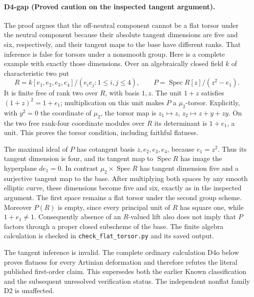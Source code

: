 \paragraph{D4-gap (Proved caution on the inspected tangent argument).}
The proof argues that the off-neutral component cannot be a
flat torsor under the neutral component because their absolute
tangent dimensions are five and six, respectively, and their
tangent maps to the base have different ranks.  That inference
is false for torsors under a nonsmooth group.  Here is a complete
example with exactly those dimensions.  Over an algebraically
closed field $k$ of characteristic two put
\[
 R=k[e_1,e_2,e_3,e_4]/(e_i e_j:1\leq i,j\leq4),
 \qquad P=\operatorname{Spec}R[z]/(z^2-e_1).
\]
It is finite free of rank two over $R$, with basis $1,z$.
The unit $1+z$ satisfies $(1+z)^2=1+e_1$; multiplication on this
unit makes $P$ a $\mu_2$-torsor.  Explicitly, with $y^2=0$ the
coordinate of $\mu_2$, the torsor map is
$z_1\mapsto z$, $z_2\mapsto z+y+zy$.
On the two free rank-four coordinate modules over $R$ its
determinant is $1+e_1$, a unit.  This proves the torsor condition,
including faithful flatness.

The maximal ideal of $P$ has cotangent basis $z,e_2,e_3,e_4$,
because $e_1=z^2$.  Thus its tangent dimension is four, and its
tangent map to $\operatorname{Spec}R$ has image the hyperplane
$de_1=0$.  In contrast $\mu_2\times\operatorname{Spec}R$ has
tangent dimension five and a surjective tangent map to the base.
After multiplying both spaces by any smooth elliptic curve,
these dimensions become five and six, exactly as in the inspected
argument.  The first space remains a flat torsor under the
second group scheme.  Moreover $P(R)$ is empty, since every
principal unit of $R$ has square one, while $1+e_1\ne1$.
Consequently absence of an $R$-valued lift also does not imply
that $P$ factors through a proper closed subscheme of the base.
The finite algebra calculation is checked in
\texttt{check\_flat\_torsor.py} and its saved output.

The tangent inference is invalid. The complete ordinary calculation D4o below proves flatness for every Artinian deformation and therefore refutes the literal published first-order claim. This supersedes both the earlier Known classification and the subsequent unresolved verification status. The independent nonflat family D2 is unaffected.

